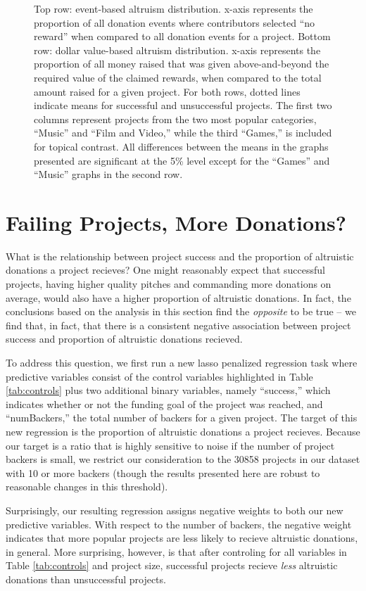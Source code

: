 \documentclass[letterpaper]{article}
\begin{document}
\begin{figure}[t]
{}
\caption{Top row: event-based altruism distribution. x-axis represents the proportion of all donation events where contributors selected ``no reward'' when compared to all donation events for a project. Bottom row: dollar value-based altruism distribution. x-axis represents the proportion of all money raised that was given above-and-beyond the required value of the claimed rewards, when compared to the total amount raised for a given project. For both rows, dotted lines indicate means for successful and unsuccessful projects. The first two columns represent projects from the two most popular categories, ``Music'' and ``Film and Video,'' while the third ``Games,'' is included for topical contrast. All differences between the means in the graphs presented are significant at the 5\% level except for the ``Games'' and ``Music'' graphs in the second row.}
\label{fig:failsucc}
\end{figure}
\section{Failing Projects, More Donations?}
What is the relationship between project success and the proportion of altruistic donations a project recieves? One might reasonably expect that successful projects, having higher quality pitches and commanding more donations on average, would also have a higher proportion of altruistic donations. In fact, the conclusions based on the analysis in this section find the \emph{opposite} to be true -- we find that, in fact, that there is a consistent negative association between project success and proportion of altruistic donations recieved.

To address this question, we first run a new lasso penalized regression task where predictive variables consist of the control variables highlighted in Table \ref{tab:controls} plus two additional binary variables, namely ``success,'' which indicates whether or not the funding goal of the project was reached, and ``numBackers,'' the total number of backers for a given project. The target of this new regression is the proportion of altruistic donations a project recieves. Because our target is a ratio that is highly sensitive to noise if the number of project backers is small, we restrict our consideration to the 30858 projects in our dataset with 10 or more backers (though the results presented here are robust to reasonable changes in this threshold).

Surprisingly, our resulting regression assigns negative weights to both our new predictive variables. With respect to the number of backers, the negative weight indicates that more popular projects are less likely to recieve altruistic donations, in general. More surprising, however, is that after controling for all variables in Table \ref{tab:controls} and project size, successful projects recieve \emph{less} altruistic donations than unsuccessful projects.
\end{document}
